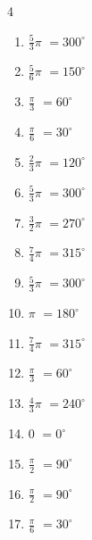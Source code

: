\begin{multicols}{4}
\begin{enumerate}
  \item $\displaystyle \frac{5}{3}\pi$
        $\displaystyle =300^{\circ}$

  \item $\displaystyle \frac{5}{6}\pi$
        $\displaystyle =150^{\circ}$

  \item $\displaystyle \frac{\pi}{3}$
        $\displaystyle =60^{\circ}$

  \item $\displaystyle \frac{\pi}{6}$
        $\displaystyle =30^{\circ}$

  \item $\displaystyle \frac{2}{3}\pi$
        $\displaystyle =120^{\circ}$

  \item $\displaystyle \frac{5}{3}\pi$
        $\displaystyle =300^{\circ}$

  \item $\displaystyle \frac{3}{2}\pi$
        $\displaystyle =270^{\circ}$

  \item $\displaystyle \frac{7}{4}\pi$
        $\displaystyle =315^{\circ}$

  \item $\displaystyle \frac{5}{3}\pi$
        $\displaystyle =300^{\circ}$

  \item $\displaystyle \pi$
        $\displaystyle =180^{\circ}$

  \item $\displaystyle \frac{7}{4}\pi$
        $\displaystyle =315^{\circ}$

  \item $\displaystyle \frac{\pi}{3}$
        $\displaystyle =60^{\circ}$

  \item $\displaystyle \frac{4}{3}\pi$
        $\displaystyle =240^{\circ}$

  \item $\displaystyle 0$
        $\displaystyle =0^{\circ}$

  \item $\displaystyle \frac{\pi}{2}$
        $\displaystyle =90^{\circ}$

  \item $\displaystyle \frac{\pi}{2}$
        $\displaystyle =90^{\circ}$

  \item $\displaystyle \frac{\pi}{6}$
        $\displaystyle =30^{\circ}$


\end{enumerate}
\end{multicols}
